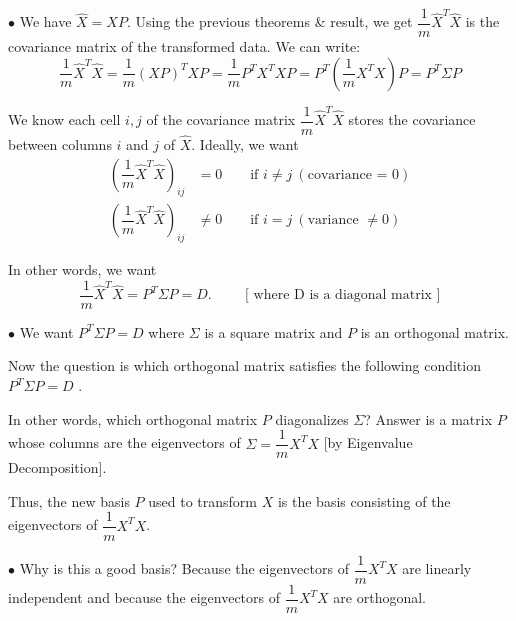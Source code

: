 \documentclass[11pt, a4paper]{article}
\begin{document}
$\bullet$ We have $\hat{X} = X P$. Using the previous theorems \& result, we get $\dfrac{1}{m} \hat{X}^T \hat{X}$ is the covariance matrix of the transformed data. We can write:
    \[
    \dfrac{1}{m} \hat{X}^T \hat{X} = \dfrac{1}{m} (X P)^T X P = \dfrac{1}{m} P^T X^T X P = P^T \left(\dfrac{1}{m} X^T X\right) P = P^T \Sigma P
    \]
    
We know each cell $i, j$ of the covariance matrix $\dfrac{1}{m} \hat{X}^T \hat{X}$ stores the covariance between columns $i$ and $j$ of $\hat{X}$. Ideally, we want
\begin{align*}
\left(\dfrac{1}{m} \hat{X}^T \hat{X}\right)_{ij} &= 0 \qquad \text{if } i \neq j \ (\text{covariance = 0}) \\
\left(\dfrac{1}{m} \hat{X}^T \hat{X}\right)_{ij} &\neq 0 \qquad \text{if } i = j \ (\text{variance } \neq 0)
\end{align*}
    
In other words, we want
\[
\dfrac{1}{m} \hat{X}^T \hat{X} = P^T \Sigma P = D. \hspace{1cm} \text{[ where D is a diagonal matrix ]}
\]

$\bullet$ We want $P^T \Sigma P = D$ where $\Sigma$ is a square matrix and $P$ is an orthogonal matrix. \\

\vspace{0.3cm}

Now the question is which orthogonal matrix satisfies the following condition $P^T \Sigma P = D $ . \\

\vspace{0.3cm}

In other words, which orthogonal matrix $P$ diagonalizes $\Sigma$? Answer is a matrix $P$ whose columns are the eigenvectors of $\Sigma = \dfrac{1}{m} X^T X$ [by Eigenvalue Decomposition]. \\

\vspace{0.3cm}

Thus, the new basis $P$ used to transform $X$ is the basis consisting of the eigenvectors of $\dfrac{1}{m} X^T X$. \\

\vspace{0.3cm}

$\bullet$ Why is this a good basis? Because the eigenvectors of $\dfrac{1}{m}X^T X$ are linearly independent and because the eigenvectors of $\dfrac{1}{m}X^T X$ are orthogonal. \\
\end{document}
